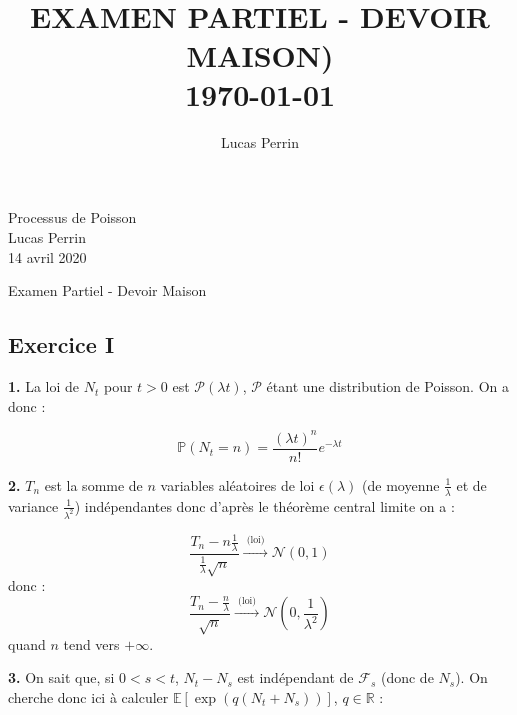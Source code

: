 \documentclass[a4paper,10pt]{report}
\title{ \normalsize \textsc{}    %
            \\[2.0cm]                               %
            \HRule{0.5pt} \\                        %
            \LARGE \textbf{\uppercase{Examen Partiel - Devoir Maison)}}    %
            \HRule{2pt} \\ [0.5cm]      %
            \normalsize \today        %
            \\
        }
\author{
       Lucas Perrin\\
}
\begin{document}
\setcounter{page}{1}
\noindent
Processus de Poisson\\
Lucas Perrin\\
14 avril 2020

\begin{center}
\huge{ Examen Partiel - Devoir Maison }
\end{center}


\subsection*{Exercice I}


\textbf{1.} La loi de $N_t$ pour $t>0$ est $\mathcal{P}(\lambda t)$, $\mathcal{P}$ étant une distribution de Poisson. On a donc :

$$
\mathbb{P}(N_t = n)=\frac{(\lambda t)^{n}}{n !} e^{-\lambda t}
$$
\newline


\textbf{2.} $T_n$ est la somme de $n$ variables aléatoires de loi $\epsilon(\lambda)$ (de moyenne $\frac{1}{\lambda}$ et de variance $\frac{1}{\lambda^2}$) indépendantes donc d'après le théorème central limite on a :

$$
\frac{T_{n}-n \frac{1}{\lambda}}{\frac{1}{\lambda} \sqrt{n}} \stackrel{\text { (loi) }}{\rightarrow} \mathcal{N}(0,1)
$$
donc : 
$$
\frac{T_{n}- \frac{n}{\lambda}}{\sqrt{n}} \stackrel{\text { (loi) }}{\rightarrow} \mathcal{N} \left( 0,\frac{1}{\lambda^2} \right)
$$
quand $n$ tend vers $+ \infty$.
\newline


\textbf{3.} On sait que, si $0 < s < t$, $N_t - N_s$ est indépendant de $\mathcal{F}_s$ (donc de $N_s$).
On cherche donc ici à calculer $\mathbb{E}\left[\exp \left(q\left(N_{t}+N_{s}\right)\right)\right]$, $q \in \mathbb{R}$ :
\end{document}

